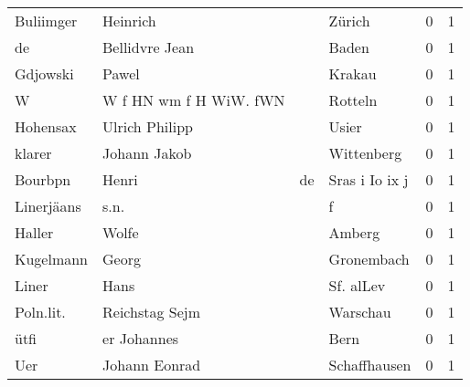 \begin{center}
\begin{tiny}
\begin{longtabu}{llllrr}
                Buliimger &                           Heinrich &             &                                      Zürich &          0 &         1 \\
                       de &                     Bellidvre Jean &             &                                       Baden &          0 &         1 \\
                 Gdjowski &                              Pawel &             &                                      Krakau &          0 &         1 \\
                        W &             W f HN wm f H WiW. fWN &             &                                     Rotteln &          0 &         1 \\
                 Hohensax &                     Ulrich Philipp &             &                                       Usier &          0 &         1 \\
                   klarer &                       Johann Jakob &             &                                  Wittenberg &          0 &         1 \\
                  Bourbpn &                              Henri &          de &                              Sras i Io ix j &          0 &         1 \\
               Linerjäans &                               s.n. &             &                                           f &          0 &         1 \\
                   Haller &                              Wolfe &             &                                      Amberg &          0 &         1 \\
                Kugelmann &                              Georg &             &                                  Gronembach &          0 &         1 \\
                    Liner &                               Hans &             &                                   Sf. alLev &          0 &         1 \\
                Poln.lit. &                     Reichstag Sejm &             &                                    Warschau &          0 &         1 \\
                     ütfi &                        er Johannes &             &                                        Bern &          0 &         1 \\
                      Uer &                      Johann Eonrad &             &                                Schaffhausen &          0 &         1 \\

\end{longtabu}
\end{tiny}
\end{center}

